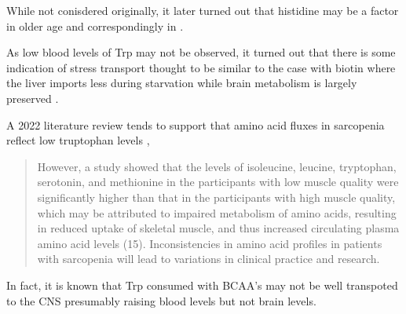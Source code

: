 \documentclass[aps,secnumarabic,balancelastpage,amsmath,amssymb,nofootinbib]{revtex4}
\begin{document}
While not conisdered originally, it later turned out that
histidine may be a factor in older age and correspondingly
in \mjmdisease \cite{ mmarchywka-MJM-2021-007-.1-table-rg}.

As low blood levels of Trp may not be observed,
it turned out that there is some indication of
stress transport
\cite{ mmarchywka-MJM-2021-007-.1-table-rg}
thought to be similar to the case with biotin
where the liver imports less during starvation while
brain metabolism is largely preserved
\cite{PachecoAlvarez_SolorzanoVargas_Gravel_Paradoxical_Regulation_Biotin_2004}.

A  2022  literature review tends to support that amino acid
fluxes in sarcopenia reflect low truptophan levels
\cite{10.3389/fendo.2021.725518},
\begin{quote}
However, a study showed that the levels of isoleucine, leucine, tryptophan, serotonin, and methionine in the participants with low muscle quality were significantly higher than that in the participants with high muscle quality, which may be attributed to impaired metabolism of amino acids, resulting in reduced uptake of skeletal muscle, and thus increased circulating plasma amino acid levels (15). Inconsistencies in amino acid profiles in patients with sarcopenia will lead to variations in clinical practice and research.
\end{quote}

In fact, it is known that Trp consumed with BCAA's may not be well transpoted
to the CNS presumably raising blood levels but not brain levels. 
\end{document}

